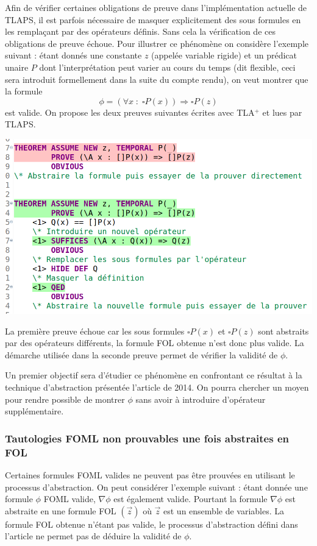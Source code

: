 \documentclass[12pt]{article}
\begin{document}
Afin de vérifier certaines obligations de preuve dans l'implémentation actuelle de TLAPS, il est parfois nécessaire de masquer explicitement des sous formules en les remplaçant par des opérateurs définis.
Sans cela la vérification de ces obligations de preuve échoue.
Pour illustrer ce phénomène on considère l'exemple suivant :
étant donnés une constante $z$ (appelée variable rigide) et un prédicat unaire $P$ dont l'interprétation peut varier au cours du temps (dit flexible, ceci sera introduit formellement dans la suite du compte rendu), on veut montrer que la formule
\[ \phi = (\forall x \; : \; \square P(x)) \Rightarrow \square P(z) \]
est valide.
On propose les deux preuves suivantes écrites avec TLA$^+$ et lues par TLAPS.
\begin{center}
  \includegraphics[width=0.8\linewidth]{tlaps_operateur}
\end{center}

La première preuve échoue car les sous formules $\square P(x)$ et $\square P(z)$ sont abstraits par des opérateurs différents, la formule FOL obtenue n'est donc plus valide.
La démarche utilisée dans la seconde preuve permet de vérifier la validité de $\phi$.

Un premier objectif sera d'étudier ce phénomène en confrontant ce résultat à la technique d'abstraction présentée l'article de 2014. On pourra chercher un moyen pour rendre possible de montrer $\phi$ sans avoir à introduire d'opérateur supplémentaire.

\subsubsection{Tautologies FOML non prouvables une fois abstraites en FOL}

Certaines formules FOML valides ne peuvent pas être prouvées en utilisant le processus d'abstraction.
On peut considérer l'exemple suivant :
étant donnée une formule $\phi$ FOML valide, $\nabla \phi$ est également valide.
Pourtant la formule $\nabla \phi$ est abstraite en une formule FOL $(\vec{z})$ où $\vec{z}$ est un ensemble de variables.
La formule FOL obtenue n'étant pas valide, le processus d'abstraction défini dans l'article ne permet pas de déduire la validité de $\phi$.
\end{document}
